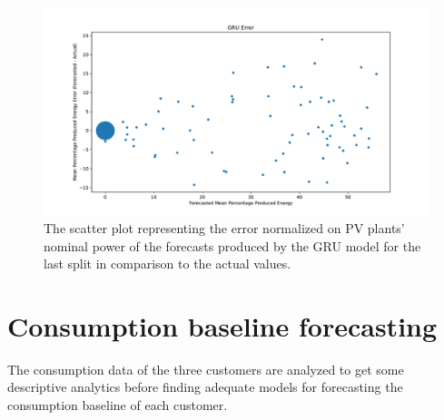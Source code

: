 \begin{figure}[H]
\centering
\includegraphics[width=1\textwidth]{images/production/GRU_percentage_error_scatter_plot_predicted}
\caption{The scatter plot representing the error normalized on PV plants' nominal power of the forecasts produced by the GRU model for the last split in comparison to the actual values.}
\label{fig:productiongruhourlyforecastsscatterplot}
\end{figure}


\section{Consumption baseline forecasting} 
\label{sec:baselineval}
\vspace{0.2 cm}

The consumption data of the three customers are analyzed to get some descriptive analytics before finding adequate models for forecasting the consumption baseline of each customer.

